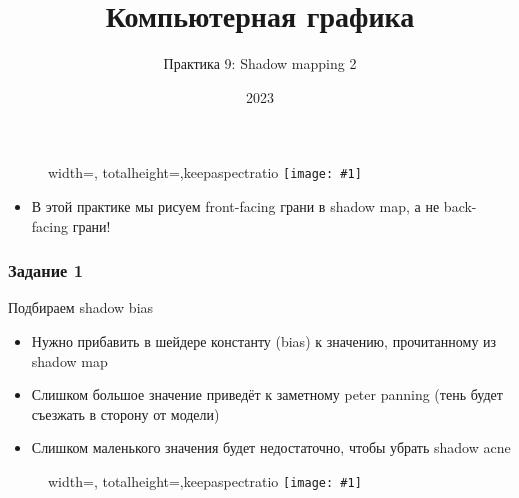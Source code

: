 \documentclass[10pt]{beamer}
\title{Компьютерная графика}
\subtitle{Практика 9: Shadow mapping 2}
\date{2023}
\newcommand{\slideimage}[1]{
  \begin{figure}
    \begin{adjustbox}{width=\textwidth, totalheight=\textheight-2\baselineskip-2\baselineskip,keepaspectratio}
      \texttt{[image: \#1]}
    \end{adjustbox}
  \end{figure}
}
\begin{document}

\frame{\titlepage}

\begin{frame}[fragile]
\slideimage{0.png}
\end{frame}

\begin{frame}[fragile]
\begin{itemize}
\item В этой практике мы рисуем front-facing грани в shadow map, а не back-facing грани!
\end{itemize}
\end{frame}

\begin{frame}[fragile]
\frametitle{Задание 1}
Подбираем shadow bias
\begin{itemize}
\item Нужно прибавить в шейдере константу (bias) к значению, прочитанному из shadow map
\item Слишком большое значение приведёт к заметному peter panning (тень будет съезжать в сторону от модели)
\item Слишком маленького значения будет недостаточно, чтобы убрать shadow acne
\end{itemize}
\end{frame}

\begin{frame}[fragile]
\slideimage{1.png}
\end{frame}
\end{document}

